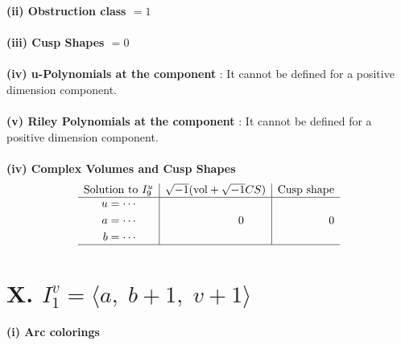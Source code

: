 \documentclass[1p]{elsarticle_modified}
\theoremstyle{definition}
\newcommand{\I}{\sqrt{-1}}
\begin{document}
\flushleft \textbf{(ii) Obstruction class $= 1$}\\~\\
\flushleft \textbf{(iii) Cusp Shapes $= 0$}\\~\\
\flushleft \textbf{(iv) u-Polynomials at the component} : It cannot be defined for a positive dimension component.\\~\\
\flushleft \textbf{(v) Riley Polynomials at the component} : It cannot be defined for a positive dimension component.\\~\\
\newpage\flushleft \textbf{(iv) Complex Volumes and Cusp Shapes}
$$\begin{array}{c|c|c} 
\text{Solution to }I^u_{9}& \I (\text{vol} + \sqrt{-1}CS) & \text{Cusp shape}\\
 \hline 
\begin{aligned}
u &= \cdots \\
a &= \cdots \\
b &= \cdots\end{aligned}
 & \phantom{-0.000000 } 0 & \phantom{-0.000000 } 0\\
 \hline 
 \end{array}
$$\newpage\renewcommand{\arraystretch}{1}
\centering \section*{X. $I^v_{1}= \langle a,\;b+1,\;v+1 \rangle$}
\flushleft \textbf{(i) Arc colorings}\\
\end{document}
